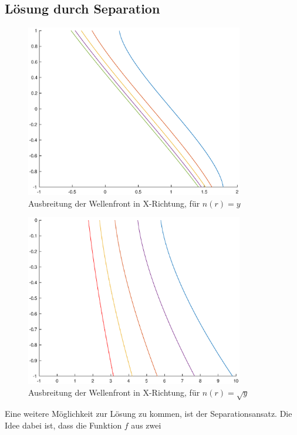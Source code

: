 \begin{refsection}
\subsection{Lösung durch Separation}
\begin{figure}
  \centering
  \includegraphics[width=0.85\textwidth]{adaptiv/images/plotwf1}
  \caption{Ausbreitung der Wellenfront in X-Richtung, für $n(r)=y$}
  \label{fig:plotwf1}
\end{figure}%
\begin{figure}
  \centering
  \includegraphics[width=0.85\textwidth]{adaptiv/images/plotwf2}
  \caption{Ausbreitung der Wellenfront in X-Richtung, für $n(r)=\sqrt{y}$}
  \label{fig:plotwf2}
\end{figure}%
%
%
Eine weitere Möglichkeit zur Lösung zu kommen, ist der
Separationsansatz. Die Idee dabei ist, dass die Funktion $f$ aus zwei

\end{refsection}
